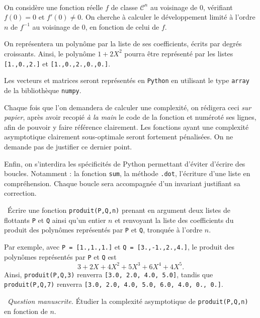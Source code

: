 \exer{[SYS-001]}
\setcounter{numques}{0}~\\

On considère une fonction réelle $f$ de classe $\mathscr{C}^n$ au voisinage de $0$, vérifiant $f(0) = 0$ et $f'(0) \neq 0$. 
On cherche à calculer le développement limité à l'ordre $n$ de $f^{-1}$ au voisinage de $0$, en fonction de celui de $f$. 

On représentera un polynôme par la liste de ses coefficients, écrits par degrés croissants. Ainsi, le polynôme $1+2X^2$ pourra être représenté par les listes \texttt{[1.,0.,2.]} et \texttt{[1.,0.,2.,0.,0.]}.

Les vecteurs et matrices seront représentés en \texttt{Python} en utilisant le type \texttt{array} de la bibliothèque \texttt{numpy}. 

Chaque fois que l'on demandera de calculer une complexité, on rédigera ceci \emph{sur papier}, après avoir recopié \emph{à la main} le code de la fonction et numéroté ses lignes, afin de pouvoir y faire référence clairement. 
Les fonctions ayant une complexité asymptotique clairement sous-optimale seront fortement pénalisées.
On ne demande pas de justifier ce dernier point. 

Enfin, on s'interdira les spécificités de Python permettant d'éviter d'écrire des boucles. Notamment : la fonction \texttt{sum}, la méthode \texttt{.dot}, l'écriture d'une liste en compréhension. Chaque boucle sera accompagnée d'un invariant justifiant sa correction. 

\medskip

\question\ Écrire une fonction  \texttt{produit(P,Q,n)} prenant en argument deux listes de flottants \texttt{P} et \texttt{Q} ainsi qu'un entier $n$ et renvoyant la liste des coefficients du produit des polynômes représentés par \texttt{P} et \texttt{Q}, tronquée à l'ordre $n$. 

Par exemple, avec \texttt{P = [1.,1.,1.]} et \texttt{Q = [3.,-1.,2.,4.]}, le produit des polynômes représentés par \texttt{P} et \texttt{Q} est 
\begin{equation*}
  3+2X+4X^2+5X^3+6X^4+4X^5. 
\end{equation*}
Ainsi, \texttt{produit(P,Q,3)} renverra \texttt{[3.0, 2.0, 4.0, 5.0]}, tandis que \texttt{produit(P,Q,7)} renverra \texttt{[3.0, 2.0, 4.0, 5.0, 6.0, 4.0, 0., 0.]}.

\medskip

\question\ \emph{Question manuscrite.} Étudier la complexité asymptotique de \texttt{produit(P,Q,n)} en fonction de $n$. 

